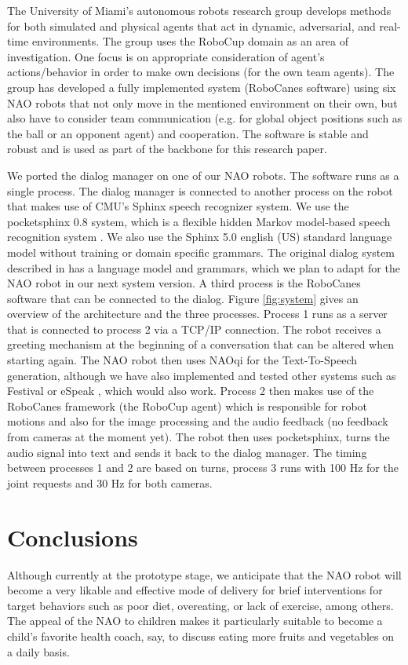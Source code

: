 \documentclass[letterpaper]{article}
\begin{document}
The University of Miami's autonomous robots research group develops methods for both simulated and
physical agents that act in dynamic, adversarial, and real-time environments. The group uses the
RoboCup domain as an area of investigation. One  focus is on appropriate consideration of agent's
actions/behavior in order to make own decisions (for the own team agents). The group has developed a
fully implemented system (RoboCanes software) using six NAO robots that not only move in the
mentioned environment on their own, but also have to consider team communication (e.g. for global
object positions such as the ball or an opponent agent) and cooperation. The software is stable and
robust and is used as part of the backbone for this research paper.

We ported the dialog manager on one of our NAO robots. The software runs as a single process. The
dialog manager is connected to another process on the robot that makes use of CMU's Sphinx speech
recognizer system. We use the pocketsphinx 0.8 system, which is a flexible hidden Markov model-based
speech recognition system \cite{huggins2006pocketsphinx}. We also use the Sphinx 5.0 english (US)
standard language model without training or domain specific grammars.  The original dialog system described in \cite{YASCLL14} has a language model and grammars, which we plan to  adapt for the NAO robot in our next system version. A third process is the
RoboCanes software that can be connected to the dialog. Figure \ref{fig:system} gives an overview of
the architecture and the three processes. Process 1 runs as a server that is connected to process 2
via a TCP/IP connection. The robot receives a greeting mechanism  at the beginning of a conversation
that can be altered when starting again. The NAO robot then uses NAOqi for the Text-To-Speech
generation, although we have also implemented and tested other systems such as Festival \cite{taylor1998architecture} or eSpeak \cite{eSpeak},
which would also work. Process 2 then makes use of the RoboCanes framework (the RoboCup agent) which
is responsible for robot motions and also for the image processing and the audio feedback (no 
feedback from cameras at the moment yet). The robot then uses pocketsphinx, turns the audio signal
into text and sends it back to the dialog manager. The timing between processes 1 and 2 are based on 
turns, process 3 runs with 100 Hz for the joint requests and 30 Hz for both cameras.

\section*{Conclusions} Although currently at the prototype stage, we anticipate that the NAO robot will become a very likable and effective mode of delivery for brief interventions for target behaviors such as poor diet, overeating, or lack of exercise, among others.  The appeal of the NAO to children \cite{belpaeme2012multimodal} makes it particularly suitable to become a child's favorite health coach, say, to discuss eating more fruits and vegetables on a daily basis.


       
   
\end{document}
